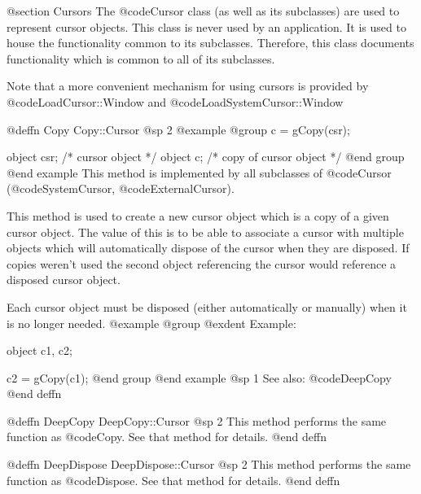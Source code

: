 @section Cursors
The @code{Cursor} class (as well as its subclasses) are used to represent
cursor objects.  This class is never used by an application.  It is used
to house the functionality common to its subclasses.  Therefore, this
class documents functionality which is common to all of its subclasses.

Note that a more convenient mechanism for using cursors is provided by
@code{LoadCursor::Window} and @code{LoadSystemCursor::Window}









@deffn {Copy} Copy::Cursor
@sp 2
@example
@group
c = gCopy(csr);

object  csr;    /*  cursor object          */
object  c;      /*  copy of cursor object  */
@end group
@end example
This method is implemented by all subclasses of @code{Cursor}
(@code{SystemCursor}, @code{ExternalCursor}).

This method is used to create a new cursor object which is a copy of a
given cursor object.  The value of this is to be able to associate a
cursor with multiple objects which will automatically dispose of the
cursor when they are disposed.  If copies weren't used the second object
referencing the cursor would reference a disposed cursor object.

Each cursor object must be disposed (either automatically or manually)
when it is no longer needed.
@example
@group
@exdent Example:

object  c1, c2;

c2 = gCopy(c1);
@end group
@end example
@sp 1
See also:  @code{DeepCopy}
@end deffn










@deffn {DeepCopy} DeepCopy::Cursor
@sp 2
This method performs the same function as @code{Copy}.  See that
method for details.
@end deffn










@deffn {DeepDispose} DeepDispose::Cursor
@sp 2
This method performs the same function as @code{Dispose}.  See that
method for details.
@end deffn







